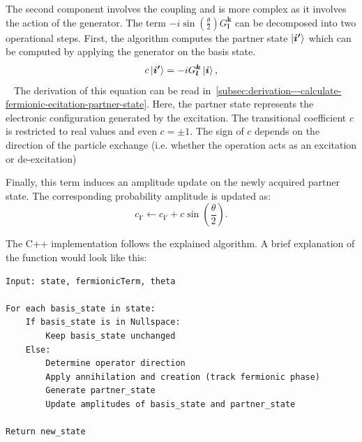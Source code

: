 The second component involves the coupling and is more complex as it involves the action of the generator.
The term $-i\sin\left(\frac{\theta}{2}\right)G^{\boldsymbol{k}}_{\boldsymbol{l}}$ can be decomposed into two operational steps.
First, the algorithm computes the partner state $\ket{\boldsymbol{i'}}$ which can be computed by applying the generator on the basis state.
\begin{equation}
    c \ket{\boldsymbol{i'}} = -iG^{\boldsymbol{k}}_{\boldsymbol{l}} \ket{\boldsymbol{i}}, \label{eq:qubit-excitation-baseline-partner-state}
\end{equation}~\cite[Appendix - Eigenstates of fermionic generators]{kottmann2020feasible}
The derivation of this equation can be read in~\ref{subsec:derivation---calculate-fermionic-ecitation-partner-state}.
Here, the partner state represents the electronic configuration generated by the excitation.
The transitional coefficient $c$ is restricted to real values and even $c = \pm 1$.
The sign of $c$ depends on the direction of the particle exchange (i.e. whether the operation acts as an excitation or de-excitation)

Finally, this term induces an amplitude update on the newly acquired partner state.
The corresponding probability amplitude is updated as:
\begin{equation}
	c_{\boldsymbol{i'}} \leftarrow c_{\boldsymbol{i'}} + c \sin\left(\frac{\theta}{2}\right). \label{eq:qubit-excitation-partner-state-update-phase}
\end{equation}
\cite[chapter II.A]{kottmann2020feasible}

The C++ implementation follows the explained algorithm.
A brief explanation of the function would look like this:
\begin{verbatim}
Input: state, fermionicTerm, theta

For each basis_state in state:
    If basis_state is in Nullspace:
        Keep basis_state unchanged
    Else:
        Determine operator direction
        Apply annihilation and creation (track fermionic phase)
        Generate partner_state
        Update amplitudes of basis_state and partner_state

Return new_state
\end{verbatim}


